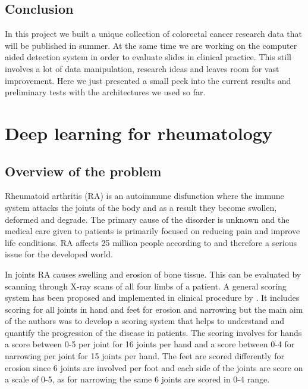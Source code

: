 \documentclass[a4paper,12pt]{article}
\begin{document}
\vspace{4mm}

\subsection{Conclusion}

\vspace{4mm}

\par In this project we built a unique collection of colorectal cancer research data that will be published in summer. At the same time we are working on the computer aided detection system in order to evaluate slides in clinical practice. This still involves a lot of data manipulation, research ideas and leaves room for vast improvement. Here we just presented a small peek into the current results and preliminary tests with the architectures we used so far.

\newpage

\section{Deep learning for rheumatology}

\vspace{7mm}

\subsection{Overview of the problem}

\vspace{4mm}

\par Rheumatoid arthritis (RA) is an autoimmune disfunction where the immune system attacks the joints of the body and as a result they become swollen, deformed and degrade. The primary cause of the disorder is unknown and the medical care given to patients is primarily focused on reducing pain and improve life conditions. RA affects 25 million people according to \cite{vos2016global} and therefore a serious issue for the developed world.

\vspace{4mm}

\par In joints RA causes swelling and erosion of bone tissue. This can be evaluated by scanning through X-ray scans of all four limbs of a patient. A general scoring system has been proposed and implemented in clinical procedure by \cite{van1995radiographic}. It includes scoring for all joints in hand and feet for erosion and narrowing but the main aim of the authors was to develop a scoring system that helps to understand and quantify the progression of the disease in patients. The scoring involves for hands a score between 0-5 per joint for 16 joints per hand and a score between 0-4 for narrowing per joint for 15 joints per hand. The feet are scored differently for erosion since 6 joints are involved per foot and each side of the joints are score on a scale of 0-5, as for narrowing the same 6 joints are scored in 0-4 range.
\end{document}

